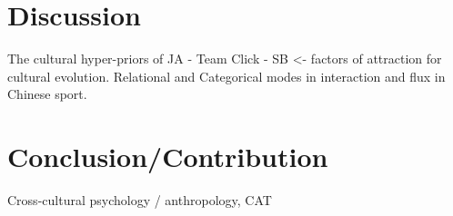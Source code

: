 \begin{CJK}{UTF8}{gbsn}
  \section{Discussion}



  The cultural hyper-priors of JA - Team Click - SB <- factors of attraction for cultural evolution.
  Relational and Categorical modes in interaction and flux in Chinese sport.



  \section{Conclusion/Contribution}
  Cross-cultural psychology / anthropology, CAT


                                                          \end{CJK}
